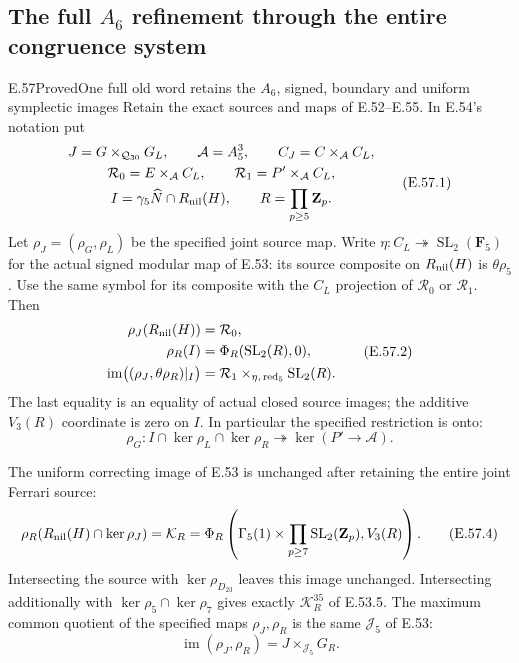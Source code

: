 \subsection{The full \texorpdfstring{$A_6$}{A6} refinement through the entire congruence system}

\begin{statement}{E.57}{Proved}{One full old word retains the $A_6$, signed, boundary and uniform symplectic images}
Retain the exact sources and maps of E.52--E.55.  In
E.54's notation put
\[
 \begin{gathered}
 J=G\times_{\mathcal Q_{30}}G_L,
 \qquad \mathcal A=A_5^3,\qquad
 C_J=C\times_{\mathcal A}C_L,\\
 \mathcal R_0=E\times_{\mathcal A}C_L,
 \qquad \mathcal R_1=P'\times_{\mathcal A}C_L,\\
 I=\gamma_5\widehat N\cap R_{\rm nil}(H),
 \qquad R=\prod_{p\ge5}\mathbf Z_p.
 \end{gathered}
 \tag{E.57.1}
\]
Let $\rho_J=(\rho_G,\rho_L)$ be the specified joint source map.
Write $\eta:C_L\twoheadrightarrow\operatorname{SL}_2(\mathbf F_5)$
for the actual signed modular map of E.53: its source
composite on $R_{\rm nil}(H)$ is $\theta\rho_5$.
Use the same symbol for its composite with the $C_L$
projection of $\mathcal R_0$ or $\mathcal R_1$.
Then
\[
 \begin{split}
 \rho_J(R_{\rm nil}(H))&=\mathcal R_0,\\
 \rho_R(I)&=\Phi_R(\operatorname{SL}_2(R),0),\\
 \operatorname{im}\bigl((\rho_J,\theta\rho_R)|_I\bigr)
   &=\mathcal R_1\times_{\eta,\,\mathrm{red}_5}
                                      \operatorname{SL}_2(R).
 \end{split}
 \tag{E.57.2}
\]
The last equality is an equality of actual closed source
images; the additive $V_3(R)$ coordinate is zero on $I$.
In particular the specified restriction is onto:
\[
 \rho_G:
 I\cap\ker\rho_L\cap\ker\rho_R
          \twoheadrightarrow\ker(P'\longrightarrow\mathcal A).
 \tag{E.57.3}
\]

The uniform correcting image of E.53 is unchanged after
retaining the entire joint Ferrari source:
\[
 \rho_R(R_{\rm nil}(H)\cap\ker\rho_J)
       =\mathcal K_R
       =\Phi_R\left(
          \Gamma_5(1)\times\prod_{p\ge7}\operatorname{SL}_2(\mathbf Z_p),
                                                   V_3(R)\right).
 \tag{E.57.4}
\]
Intersecting the source with $\ker\rho_{D_{23}}$ leaves
this image unchanged.  Intersecting additionally with
$\ker\rho_5\cap\ker\rho_7$ gives exactly
$\mathcal K_R^{35}$ of E.53.5.
The maximum common quotient of the specified maps
$\rho_J,\rho_R$ is the same $\mathcal J_5$ of E.53:
\[
        \operatorname{im}(\rho_J,\rho_R)
                    =J\times_{\mathcal J_5}G_R.
 \tag{E.57.5}
\]


\end{statement}
